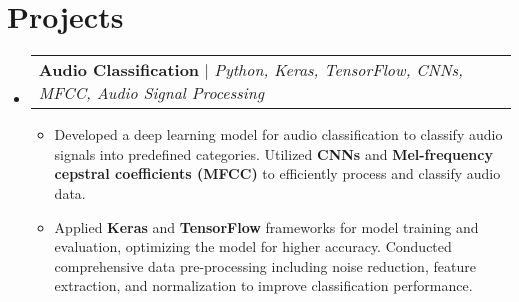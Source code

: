 \documentclass[a4paper,20pt]{article}
\makeatletter
\newcommand{\resumeSectionListStart}{\begin{itemize}[leftmargin=*,label={}]}
\newcommand{\resumeSectionListEnd}{\end{itemize}}
\newcommand{\resumeItemWithoutTitle}[1]{
    \item[$\bullet$]\small{
        {#1 \vspace{-2pt}}
    }
}
\newcommand{\resumeProjectHeading}[2]{
    \vspace{-1pt}\item
    \begin{tabular*}{0.97\textwidth}{l@{\extracolsep{\fill}}r}
      \small#1 & #2 \\
    \end{tabular*}\vspace{-5pt}
}
\newcommand{\resumeItemListStart}{\begin{itemize}}
\newcommand{\resumeItemListEnd}{\end{itemize}\vspace{-5pt}}
\makeatother
\begin{document}

\section{Projects}
    \resumeSectionListStart
        \resumeProjectHeading{\textbf{Audio Classification} $|$ \emph{Python, Keras, TensorFlow, CNNs, MFCC, Audio Signal Processing}}{}
            \resumeItemListStart
                \resumeItemWithoutTitle{
                    Developed a deep learning model for audio classification to classify audio signals into predefined categories. Utilized \textbf{CNNs} and \textbf{Mel-frequency cepstral coefficients (MFCC)} to efficiently process and classify audio data.
                }
                \resumeItemWithoutTitle{
                    Applied \textbf{Keras} and \textbf{TensorFlow} frameworks for model training and evaluation, optimizing the model for higher accuracy. Conducted comprehensive data pre-processing including noise reduction, feature extraction, and normalization to improve classification performance.
                }
            \resumeItemListEnd
    \resumeSectionListEnd
\end{document}
